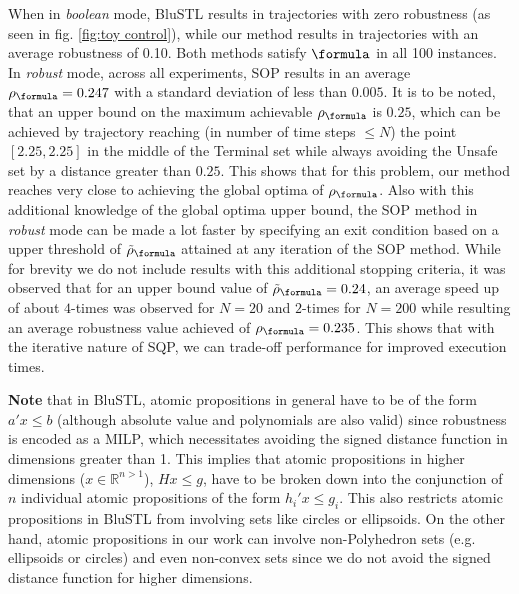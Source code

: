 \begin{exmp}
When in \textit{boolean} mode, BluSTL results in trajectories with zero robustness (as seen in fig. \ref{fig:toy control}), while our method results in trajectories with an average robustness of 0.10. Both methods satisfy $\formula$ in all 100 instances. In \textit{robust} mode, across all experiments, SOP results in an average $\rob_{\formula}=0.247$ with a standard deviation of less than $0.005$. It is to be noted, that an upper bound on the maximum achievable $\rob_{\formula}$ is $0.25$, which can be achieved by trajectory reaching (in number of time steps $\leq N$) the point $[2.25,2.25]$ in the middle of the Terminal set while always avoiding the Unsafe set by a distance greater than $0.25$. This shows that for this problem, our method reaches very close to achieving the global optima of $\rob_{\formula}$. Also with this additional knowledge of the global optima upper bound, the SOP method in \textit{robust} mode can be made a lot faster by specifying an exit condition based on a upper threshold of $\srob_{\formula}$ attained at any iteration of the SOP method. While for brevity we do not include results with this additional stopping criteria, it was observed that for an upper bound value of $\srob_{\formula}=0.24$, an average speed up of about $4$-times was observed for $N=20$ and $2$-times for $N=200$ while resulting an average robustness value achieved of $\rob_{\formula} = 0.235$. This shows that with the iterative nature of SQP, we can trade-off performance for improved execution times.
\end{exmp}

\textbf{Note} that in BluSTL, atomic propositions in general have to be of the form $a'x\leq b$ (although absolute value and polynomials are also valid) since robustness is encoded as a MILP, which necessitates avoiding the signed distance function in dimensions greater than 1. This implies that atomic propositions in higher dimensions ($x\in \mathbb{R}^{n>1}$), $Hx \leq g$, have to be broken down into the conjunction of $n$ individual atomic propositions of the form $h_i'x \leq g_i$. This also restricts atomic propositions in BluSTL from involving sets like circles or ellipsoids. On the other hand, atomic propositions in our work can involve non-Polyhedron sets (e.g. ellipsoids or circles) and even non-convex sets since we do not avoid the signed distance function for higher dimensions.

